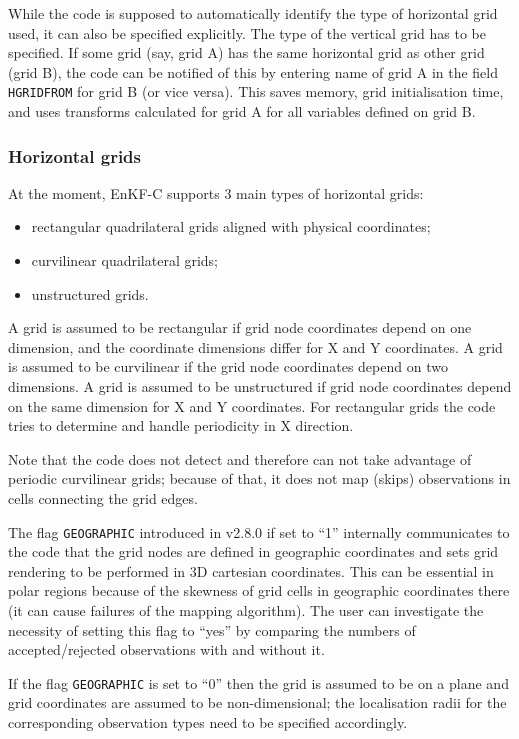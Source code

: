 \documentclass[11pt]{report}
\begin{document}
While the code is supposed to automatically identify the type of horizontal grid used, it can also be specified explicitly.
The type of the vertical grid has to be specified.
If some grid (say, grid A) has the same horizontal grid as other grid (grid B), the code can be notified of this by entering name of grid A in the field \verb|HGRIDFROM| for grid B (or vice versa).
This saves memory, grid initialisation time, and uses transforms calculated for grid A for all variables defined on grid B.

\subsubsection{Horizontal grids}
\label{sec:hgrid}

At the moment, EnKF-C supports 3 main types of horizontal grids:
\begin{itemize}
\item rectangular quadrilateral grids aligned with physical coordinates;
\item curvilinear quadrilateral grids;
\item unstructured grids.
\end{itemize}
A grid is assumed to be rectangular if grid node coordinates depend on one dimension, and the coordinate dimensions differ for X and Y coordinates.
A grid is assumed to be curvilinear if the grid node coordinates depend on two dimensions.
A grid is assumed to be unstructured if grid node coordinates depend on the same dimension for X and Y coordinates.
For rectangular grids the code tries to determine and handle periodicity in X direction.

Note that the code does not detect and therefore can not take advantage of periodic curvilinear grids; because of that, it does not map (skips) observations in cells connecting the grid edges.

The flag \verb|GEOGRAPHIC| introduced in v2.8.0 if set to ``1'' internally communicates to the code that the grid nodes are defined in geographic coordinates and sets grid rendering to be performed in 3D cartesian coordinates.
This can be essential in polar regions because of the skewness of grid cells in geographic coordinates there (it can cause failures of the mapping algorithm).
The user can investigate the necessity of setting this flag to ``yes'' by comparing the numbers of accepted/rejected observations with and without it.

If the flag \verb|GEOGRAPHIC| is set to ``0'' then the grid is assumed to be on a plane and grid coordinates are assumed to be non-dimensional; the localisation radii for the corresponding observation types need to be specified accordingly.
\end{document}
